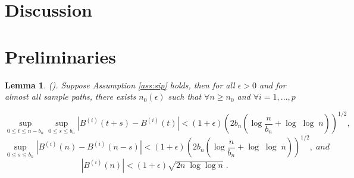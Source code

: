 \documentclass[11pt]{article}
\newtheorem{lemma}{Lemma}
\theoremstyle{remark}
\begin{document}
\section{Discussion} \label{sec:discussion}


\appendix

\section{Preliminaries} \label{apdx:preliminaries}

\begin{lemma}
\label{lemma: brownian}
(\cite{csorgo2014strong}). Suppose Assumption \ref{ass:sip} holds, then for all $\epsilon > 0$ and for almost all sample paths, there exists $n_{0}\left(\epsilon\right)$ such that $\forall n\geq n_{0}$ and $\forall i = 1, ..., p$

\[
\sup_{0\leq t \leq n-b_n}\sup_{0 \leq s \leq b_n} \left| B^{\left(i\right)}\left(t+s\right) - B^{\left(i\right)}\left(t\right) \right| < \left(1+ \epsilon\right)\left(2b_n\left(\log\dfrac{n}{b_n} + \log\; \log\; n\right)\right)^{1/2} ,
\]
%
\[
\sup_{0 \leq s \leq b_n} \left|B^{\left(i\right)}\left(n\right) - B^{\left(i\right)}\left(n - s\right)\right| < \left(1+ \epsilon\right)\left(2b_n\left(\log\dfrac{n}{b_n} + \log\;\log\;n\right)\right)^{1/2} , \;and
\]
%
\[
\left|B^{\left(i\right)}\left(n\right)\right| < \left(1+\epsilon\right)\sqrt{2n\;\log \log n} \; . 
\]
\end{lemma}


\end{document}

